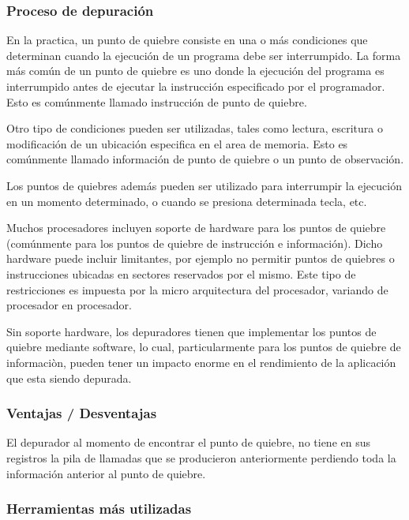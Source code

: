 \documentclass[12pt,a4paper]{report}
\begin{document}
			\subsubsection{Proceso de depuración}

En la practica, un punto de quiebre consiste en una o más condiciones que determinan cuando la ejecución de un programa debe ser interrumpido.  La forma más común de un punto de quiebre es uno donde la ejecución del programa es interrumpido antes de ejecutar la instrucción especificado por el programador.  Esto es comúnmente llamado instrucción de punto de quiebre.

Otro tipo de condiciones pueden ser utilizadas, tales como lectura, escritura o modificación de un ubicación especifica en el area de memoria.  Esto es comúnmente llamado información de punto de quiebre o un punto de observación.

Los puntos de quiebres además pueden ser utilizado para interrumpir la ejecución en un momento determinado, o cuando se presiona determinada tecla, etc.

Muchos procesadores incluyen soporte de hardware para los puntos de quiebre (comúnmente para los puntos de quiebre de instrucción e información).  Dicho hardware puede incluir limitantes, por ejemplo no permitir puntos de quiebres o instrucciones ubicadas en sectores reservados por el mismo.  Este tipo de restricciones es impuesta por la micro arquitectura del procesador, variando de procesador en procesador.

Sin soporte hardware, los depuradores tienen que implementar los puntos de quiebre mediante software, lo cual, particularmente para los puntos de quiebre de informaciòn, pueden tener un impacto enorme en el rendimiento de la aplicación que esta siendo depurada.


			\subsubsection{Ventajas / Desventajas}

El depurador al momento de encontrar el punto de quiebre, no tiene en sus registros la pila de llamadas que se producieron anteriormente perdiendo toda la información anterior al punto de quiebre.

			\subsubsection{Herramientas más utilizadas}
\end{document}
